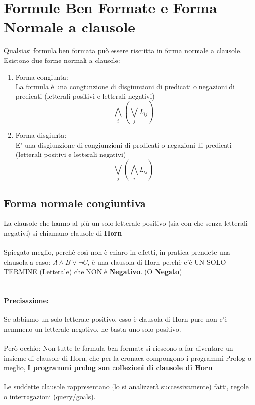 \documentclass[12pt, a4paper, openany, oneside]{book}
\begin{document}
\section{Formule Ben Formate e Forma Normale a clausole}
Qualsiasi formula ben formata può essere riscritta in forma normale a clausole.
Esistono due forme normali a clausole:
\begin{enumerate}
	\item Forma congiunta: \\
	La formula è una congiunzione di disgiunzioni di predicati o negazioni di 
	predicati (letterali positivi e letterali negativi) \\ 
	\[\bigwedge \limits_{i} (\bigvee \limits_{j} L_{ij})\]
	\item Forma disgiunta: \\
	E' una disgiunzione di congiunzioni di predicati o negazioni di predicati
	(letterali positivi e letterali negativi)
	\[\bigvee \limits _{j} (\bigwedge \limits _{i} L_{ij})\]
\end{enumerate}
\subsection{Forma normale congiuntiva}
La clausole che hanno al più un solo letterale positivo (sia con che senza 
letterali negativi) si chiamano clausole di \color{red} \textbf{Horn} \color{black}
\\ \\
Spiegato meglio, perchè così non è chiaro in effetti, in pratica prendete una 
clausola a caso: $A \wedge B \vee \neg C $, è una clausola di Horn perchè c'è
UN SOLO TERMINE (Letterale) che NON è \textbf{Negativo}. (O \textbf{Negato})
\\ \\
\paragraph{Precisazione: } Se abbiamo un solo letterale positivo, esso è clausola
di Horn pure non c'è nemmeno un letterale negativo,  ne basta uno solo positivo.
\\ \\
Però occhio:
Non tutte le formula ben formate si riescono a far diventare un insieme di 
clausole di Horn, che per la cronaca compongono i programmi Prolog o meglio, 
\color{blue} \textbf{I programmi prolog son collezioni di clausole di Horn} 
\color{black}
\\ \\
Le suddette clausole rappresentano (lo si analizzerà successivamente) fatti, 
regole o interrogazioni (query/goals).
\end{document}
